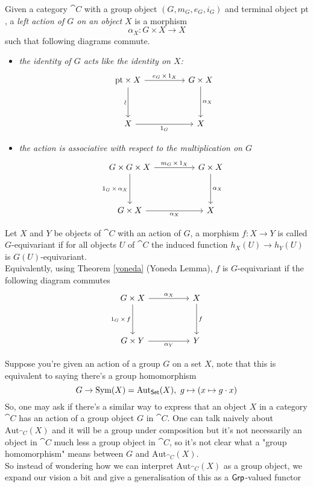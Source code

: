 \begin{definition}\label{grpaction}
Given a category $\cat{C}$ with a group object $(G,m_G,e_G,i_G)$ and terminal object $\mathrm{pt}$, a \emph{left action of $G$ on an object $X$} is a morphism
\[\alpha_X: G \times X \to X\]
such that following diagrams commute.
\begin{itemize}
\item \emph{the identity of $G$ acts like the identity on $X$:}
\[\begin{tikzcd}[row sep=huge, column sep = huge]
\mathrm{pt} \times X \arrow[d, "\sim"', sloped] \arrow[r, "e_G\, \times\, 1_X"] & G\times X \arrow[d, "\alpha_X"] \\
X \arrow[r, "1_G"']                                                 & X                       
\end{tikzcd}\]
\item \emph{the action is associative with respect to the multiplication on $G$}
\[\begin{tikzcd}[row sep=huge, column sep = huge]
G \times G \times X \arrow[d, "1_G\, \times\, \alpha_X"'] \arrow[r, "m_G\, \times\, 1_X"] & G\times X \arrow[d, "\alpha_X"] \\
G\times X \arrow[r, "\alpha_X"']                                                 & X                       
\end{tikzcd}\]
\end{itemize}
Let $X$ and $Y$ be objects of $\cat{C}$ with an action of $G$, a morphism $f : X \to Y$ is called $G$-equivariant if for all objects $U$ of $\cat{C}$ the induced function $h_X(U) \to h_Y(U)$ is $G(U)$-equivariant.\\[0.5em]
Equivalently, using Theorem \ref{yoneda} (Yoneda Lemma), $f$ is $G$-equivariant if the following diagram commutes
\[\begin{tikzcd}[row sep=huge, column sep = huge]
G \times X \arrow[d, "1_G\,\times\,f"'] \arrow[r, "\alpha_X"] & X \arrow[d, "f"] \\
G \times Y \arrow[r, "\alpha_Y"'] & Y
\end{tikzcd}\]
\end{definition}

\vspace*{0.1in}

\begin{discussion}
Suppose you're given an action of a group $G$ on a set $X$, note that this is equivalent to saying there's a group homomorphism
\[G \to \mathrm{Sym}(X) = \mathrm{Aut}_{\mathsf{Set}}(X),\ g \mapsto (x\mapsto g\cdot x)\]
So, one may ask if there's a similar way to express that an object $X$ in a category $\cat{C}$ has an action of a group object $G$ in $\cat{C}$. One can talk naively about $\mathrm{Aut}_{\cat{C}}(X)$ and it will be a group under composition but it's not necessarily an object in $\cat{C}$ much less a group object in $\cat{C}$, so it's not clear what a "group homomorphism" means between $G$ and $\mathrm{Aut}_{\cat{C}}(X)$.\\[0.5em]
So instead of wondering how we can interpret $\mathrm{Aut}_{\cat{C}}(X)$ as a group object, we expand our vision a bit and give a generalisation of this as a $\mathsf{Grp}$-valued functor
\end{discussion}

